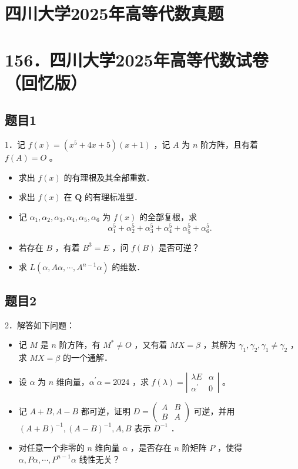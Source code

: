 \documentclass{article}
\begin{document}
\section*{四川大学2025年高等代数真题}
\section*{156．四川大学2025年高等代数试卷（回忆版）}

\subsection{题目1}
1．记 \(f(x)=\left(x^{5}+4 x+5\right)(x+1)\) ，记 \(A\) 为 \(n\) 阶方阵，且有着 \(f(A)=O\) 。

\begin{itemize}
  \item[（1）] 求出 \(f(x)\) 的有理根及其全部重数．
  \item[（2）] 求出 \(f(x)\) 在 \(\mathbf{Q}\) 的有理标准型．
  \item[（3）] 记 \(\alpha_{1}, \alpha_{2}, \alpha_{3}, \alpha_{4}, \alpha_{5}, \alpha_{6}\) 为 \(f(x)\) 的全部复根，求
\[
\alpha_{1}^{5}+\alpha_{2}^{5}+\alpha_{3}^{5}+\alpha_{4}^{5}+\alpha_{5}^{5}+\alpha_{6}^{5} .
\]
  \item[（4）] 若存在 \(B\) ，有着 \(B^{3}=E\) ，问 \(f(B)\) 是否可逆？
  \item[（5）] 求 \(L\left(\alpha, A \alpha, \cdots, A^{n-1} \alpha\right)\) 的维数．
\end{itemize}

\subsection{题目2}
2．解答如下问题：

\begin{itemize}
  \item[（1）] 记 \(M\) 是 \(n\) 阶方阵，有 \(M^{*} \neq O\) ，又有着 \(M X=\beta\) ，其解为 \(\gamma_{1}, \gamma_{2}, \gamma_{1} \neq \gamma_{2}\) ，求 \(M X=\beta\) 的一个通解．
  \item[（2）] 设 \(\alpha\) 为 \(n\) 维向量，\(\alpha^{\prime} \alpha=2024\) ，求 \(f(\lambda)=\left|\begin{array}{cc}\lambda E & \alpha \\ \alpha^{\prime} & 0\end{array}\right|\) 。
  \item[（3）] 记 \(A+B, A-B\) 都可逆，证明 \(D=\left(\begin{array}{cc}A & B \\ B & A\end{array}\right)\) 可逆，并用 \((A+B)^{-1},(A-B)^{-1}, A, B\) 表示 \(D^{-1}\) ．
  \item[（4）] 对任意一个非零的 \(n\) 维向量 \(\alpha\) ，是否存在 \(n\) 阶矩阵 \(P\) ，使得 \(\alpha, P \alpha, \cdots, P^{n-1} \alpha\) 线性无关？
\end{itemize}
\end{document}
